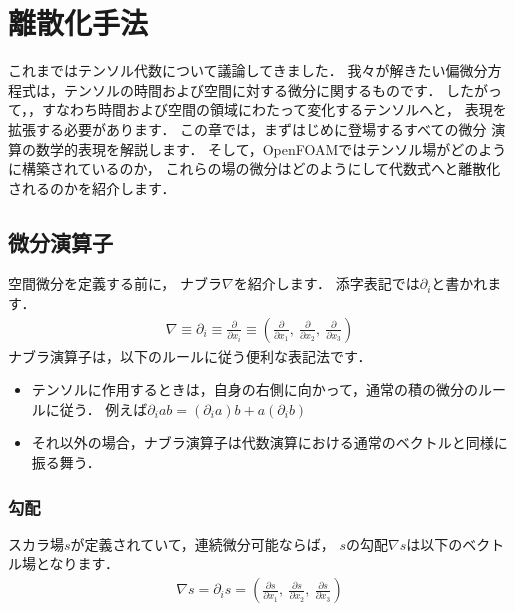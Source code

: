 \chapter{離散化手法}
\label{chap:2}
%
これまではテンソル代数について議論してきました．
我々が解きたい偏微分方程式は，テンソルの時間および空間に対する微分に関するものです．
したがって，，すなわち時間および空間の領域にわたって変化するテンソルへと，
表現を拡張する必要があります．
この章では，まずはじめに登場するすべての微分
%
演算の数学的表現を解説します．
そして，OpenFOAMではテンソル場がどのように構築されているのか，
これらの場の微分はどのようにして代数式へと離散化されるのかを紹介します．



\section{微分演算子}
\label{sec:2.1}
空間微分を定義する前に，
%
%
ナブラ$\nabla$を紹介します．
添字表記では$\partial_{i}$と書かれます．
\begin{align}
 \label{eq:2.1}
 \nabla \equiv \partial_{i} \equiv \frac{\partial}{\partial x_{i}}
 \equiv \left(\frac{\partial}{\partial x_{1}},\
 \frac{\partial}{\partial x_{2}},\
 \frac{\partial}{\partial x_{3}}\right)
\end{align}
ナブラ演算子は，以下のルールに従う便利な表記法です．
\begin{itemize}
 \item テンソルに作用するときは，自身の右側に向かって，通常の積の微分のルールに従う．
       例えば$\partial_{i}ab = (\partial_{i}a)b + a(\partial_{i}b)$
 \item それ以外の場合，ナブラ演算子は代数演算における通常のベクトルと同様に振る舞う．
\end{itemize}


\subsection{勾配}
\label{ssec:2.1.1}
スカラ場$s$が定義されていて，連続微分可能ならば，
$s$の勾配$\nabla s$は以下のベクトル場となります．
\begin{align}
 \label{eq:2.2}
 \nabla s = \partial_{i}s
 = \left(\frac{\partial s}{\partial x_{1}},\
 \frac{\partial s}{\partial x_{2}},\
 \frac{\partial s}{\partial x_{3}}\right)
\end{align}


